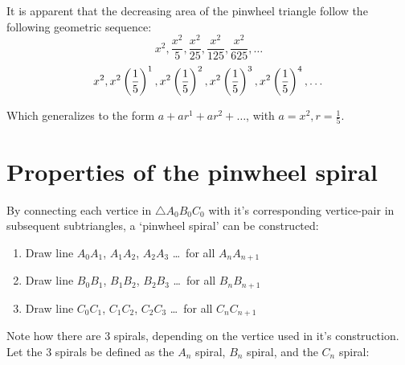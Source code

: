 \noindent
It is apparent that the decreasing area of the pinwheel triangle follow the following geometric sequence:
\begin{equation}
    x^2, \frac{x^2}{5}, \frac{x^2}{25}, \frac{x^2}{125}, \frac{x^2}{625}, \ldots
\end{equation}
\begin{equation}
    x^2, x^2\left(\frac{1}{5}\right)^1, x^2\left(\frac{1}{5}\right)^2, x^2\left(\frac{1}{5}\right)^3, x^2\left(\frac{1}{5}\right)^4, \ldots \\
\end{equation}

\noindent
Which generalizes to the form $a + ar^1 + ar^2 + \ldots$, with $a = x^2, r = \frac{1}{5}$.

\newpage
\section{Properties of the pinwheel spiral}
By connecting each vertice in $\triangle A_{0}B_{0}C_{0}$ with it's corresponding vertice-pair in subsequent subtriangles, a `pinwheel spiral' can be constructed:

\begin{enumerate}
    \item Draw line $A_{0}A_{1}$, $A_{1}A_{2}$, $A_{2}A_{3}$ \ldots\ for all $A_{n}A_{n + 1}$
    \item Draw line $B_{0}B_{1}$, $B_{1}B_{2}$, $B_{2}B_{3}$ \ldots\ for all $B_{n}B_{n + 1}$
    \item Draw line $C_{0}C_{1}$, $C_{1}C_{2}$, $C_{2}C_{3}$ \ldots\ for all $C_{n}C_{n + 1}$
\end{enumerate}



\noindent
Note how there are 3 spirals, depending on the vertice used in it's construction. Let the 3 spirals be defined as the $A_n$ spiral, $B_n$ spiral, and the $C_n$ spiral:






